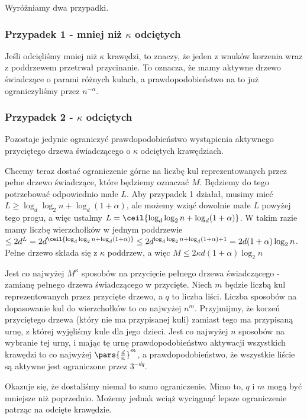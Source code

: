 Wyróżniamy dwa przypadki.

\subsubsection*{Przypadek 1 - mniej niż \(\kappa\) odciętych}

Jeśli odcięliśmy mniej niż \(\kappa\) krawędzi, to znaczy, że jeden z wnuków korzenia wraz z poddrzewem przetrwał przycinanie.
To oznacza, że mamy aktywne drzewo świadczące o parami różnych kulach, a prawdopodobieństwo na to już ograniczyliśmy przez \(n^{-\alpha}\).

\subsubsection*{Przypadek 2 - \(\kappa\) odciętych}

Pozostaje jedynie ograniczyć prawdopodobieństwo wystąpienia aktywnego przyciętego drzewa świadczącego o \(\kappa\) odciętych krawędziach.

Chcemy teraz dostać ograniczenie górne na liczbę kul reprezentowanych przez pełne drzewo świadczące, które będziemy oznaczać \(M\). Będziemy do tego potrzebować odpowiednio małe \(L\). Aby przypadek 1 działał, musimy mieć \(L \geq \log_d \log_2 n + \log_d(1 + \alpha)\), ale możemy wziąć dowolnie małe \(L\) powyżej tego progu, a więc ustalmy \(L = \ceil{\log_d \log_2 n + \log_d(1 + \alpha)}\). W takim razie mamy liczbę wierzchołków w jednym poddrzewie \(\leq 2 d^L = 2 d^{\ceil{\log_d \log_2 n + \log_d(1 + \alpha)}} \leq 2d^{\log_d \log_2 n + \log_d(1 + \alpha) + 1} = 2 d (1 + \alpha)\log_2 n \). Pełne drzewo składa się z \(\kappa\) poddrzew, a więc \(M \leq 2 \kappa d (1 + \alpha)\log_2 n \)

Jest co najwyżej \(M^\kappa\) sposobów na przycięcie pełnego drzewa świadczącego - zamianę pełnego drzewa świadczącego w przycięte.
Niech \(m\) będzie liczbą kul reprezentowanych przez przycięte drzewo, a \(q\) to liczba liści. Liczba sposobów na dopasowanie kul do wierzchołków to co najwyżej \(n^m\).
Przyjmijmy, że korzeń przyciętego drzewa (który nie ma przypisanej kuli) zamiast tego ma przypisaną urnę, z której wyjęliśmy kule dla jego dzieci.
Jest co najwyżej \(n\) sposobów na wybranie tej urny, i mając tę urnę prawdopodobieństwo aktywacji wszystkich krawędzi to co najwyżej \(\pars{\frac{d}{n}}^m\), a prawdopodobieństwo, że wszystkie liście są aktywne jest ograniczone przez \(3^{-dq}\).

Okazuje się, że dostaliśmy niemal to samo ograniczenie. Mimo to, \(q\) i \(m\) mogą być mniejsze niż poprzednio.
Możemy jednak wciąż wyciągnąć lepsze ograniczenie patrząc na odcięte krawędzie.


